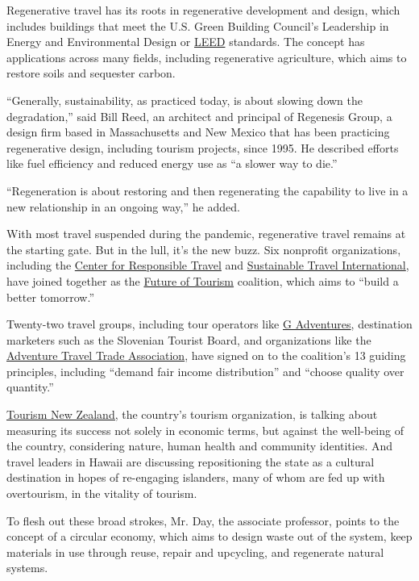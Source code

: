 Regenerative travel has its roots in regenerative development and
design, which includes buildings that meet the U.S. Green Building
Council's Leadership in Energy and Environmental Design or
\href{https://www.usgbc.org/help/what-leed}{LEED} standards. The concept
has applications across many fields, including regenerative agriculture,
which aims to restore soils and sequester carbon.

``Generally, sustainability, as practiced today, is about slowing down
the degradation,'' said Bill Reed, an architect and principal of
Regenesis Group, a design firm based in Massachusetts and New Mexico
that has been practicing regenerative design, including tourism
projects, since 1995. He described efforts like fuel efficiency and
reduced energy use as ``a slower way to die.''

``Regeneration is about restoring and then regenerating the capability
to live in a new relationship in an ongoing way,'' he added.

With most travel suspended during the pandemic, regenerative travel
remains at the starting gate. But in the lull, it's the new buzz. Six
nonprofit organizations, including the
\href{https://www.responsibletravel.org/}{Center for Responsible Travel}
and \href{https://sustainabletravel.org/}{Sustainable Travel
International}, have joined together as the
\href{https://www.futureoftourism.org/}{Future of Tourism} coalition,
which aims to ``build a better tomorrow.''

Twenty-two travel groups, including tour operators like
\href{https://www.gadventures.com/}{G Adventures}, destination marketers
such as the Slovenian Tourist Board, and organizations like the
\href{https://www.adventuretravel.biz/}{Adventure Travel Trade
Association}, have signed on to the coalition's 13 guiding principles,
including ``demand fair income distribution'' and ``choose quality over
quantity.''

\href{https://www.tourismnewzealand.com/}{Tourism New Zealand,} the
country's tourism organization, is talking about measuring its success
not solely in economic terms, but against the well-being of the country,
considering nature, human health and community identities. And travel
leaders in Hawaii are discussing repositioning the state as a cultural
destination in hopes of re-engaging islanders, many of whom are fed up
with overtourism, in the vitality of tourism.

To flesh out these broad strokes, Mr. Day, the associate professor,
points to the concept of a circular economy, which aims to design waste
out of the system, keep materials in use through reuse, repair and
upcycling, and regenerate natural systems.

